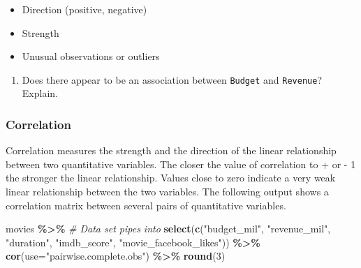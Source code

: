 \documentclass[
]{report}
\newenvironment{Shaded}{\begin{snugshade}}{\end{snugshade}}
\newcommand{\CommentTok}[1]{\textcolor[rgb]{0.56,0.35,0.01}{\textit{#1}}}
\newcommand{\DataTypeTok}[1]{\textcolor[rgb]{0.13,0.29,0.53}{#1}}
\newcommand{\DecValTok}[1]{\textcolor[rgb]{0.00,0.00,0.81}{#1}}
\newcommand{\KeywordTok}[1]{\textcolor[rgb]{0.13,0.29,0.53}{\textbf{#1}}}
\newcommand{\NormalTok}[1]{#1}
\newcommand{\OperatorTok}[1]{\textcolor[rgb]{0.81,0.36,0.00}{\textbf{#1}}}
\newcommand{\StringTok}[1]{\textcolor[rgb]{0.31,0.60,0.02}{#1}}
\providecommand{\tightlist}{%
  \setlength{\itemsep}{0pt}\setlength{\parskip}{0pt}}
\begin{document}
\vspace{.4in}

\begin{itemize}
\tightlist
\item
  Direction (positive, negative)
\end{itemize}

\vspace{.4in}

\begin{itemize}
\tightlist
\item
  Strength
\end{itemize}

\vspace{.4in}

\begin{itemize}
\tightlist
\item
  Unusual observations or outliers
\end{itemize}

\vspace{.4in}

\begin{enumerate}
\def\labelenumi{\arabic{enumi}.}
\setcounter{enumi}{4}
\tightlist
\item
  Does there appear to be an association between \texttt{Budget} and \texttt{Revenue}? Explain.
\end{enumerate}

\vspace{1in}

\hypertarget{correlation}{%
\subsubsection*{Correlation}\label{correlation}}

Correlation measures the strength and the direction of the linear relationship between two quantitative variables. The closer the value of correlation to + or - 1 the stronger the linear relationship. Values close to zero indicate a very weak linear relationship between the two variables. The following output shows a correlation matrix between several pairs of quantitative variables.

\newpage

\begin{Shaded}
\begin{Highlighting}[]
\NormalTok{movies }\OperatorTok{\%\textgreater{}\%}\StringTok{  }\CommentTok{\# Data set pipes into}
\StringTok{  }\KeywordTok{select}\NormalTok{(}\KeywordTok{c}\NormalTok{(}\StringTok{"budget\_mil"}\NormalTok{, }\StringTok{"revenue\_mil"}\NormalTok{, }
           \StringTok{"duration"}\NormalTok{, }\StringTok{"imdb\_score"}\NormalTok{, }
           \StringTok{"movie\_facebook\_likes"}\NormalTok{)) }\OperatorTok{\%\textgreater{}\%}
\StringTok{  }\KeywordTok{cor}\NormalTok{(}\DataTypeTok{use=}\StringTok{"pairwise.complete.obs"}\NormalTok{) }\OperatorTok{\%\textgreater{}\%}
\StringTok{  }\KeywordTok{round}\NormalTok{(}\DecValTok{3}\NormalTok{)}
\end{Highlighting}
\end{Shaded}
\end{document}
